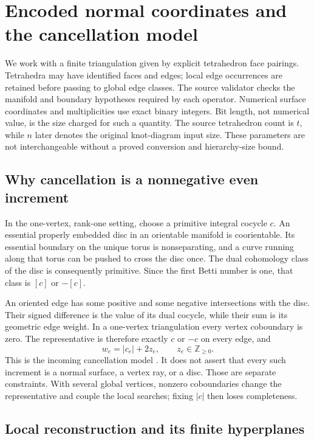 \section{Encoded normal coordinates and the cancellation model}
\label{sec:normal-background}

We work with a finite triangulation given by explicit tetrahedron face
pairings. Tetrahedra may have identified faces and edges; local edge
occurrences are retained before passing to global edge classes. The source
validator checks the manifold and boundary hypotheses required by each
operator. Numerical surface coordinates and multiplicities use exact binary
integers. Bit length, not numerical value, is the size charged for such a
quantity. The source tetrahedron count is $t$, while $n$ later denotes the
original knot-diagram input size. These parameters are not interchangeable
without a proved conversion and hierarchy-size bound.

\subsection{Why cancellation is a nonnegative even increment}

In the one-vertex, rank-one setting, choose a primitive integral cocycle $c$.
An essential properly embedded disc in an orientable manifold is coorientable.
Its essential boundary on the unique torus is nonseparating, and a curve
running along that torus can be pushed to cross the disc once. The dual
cohomology class of the disc is consequently primitive. Since the first Betti
number is one, that class is $[c]$ or $-[c]$.

An oriented edge has some positive and some negative intersections with the
disc. Their signed difference is the value of its dual cocycle, while their
sum is its geometric edge weight. In a one-vertex triangulation every vertex
coboundary is zero. The representative is therefore exactly $c$ or $-c$ on
every edge, and
\[
 w_e=|c_e|+2z_e,\qquad z_e\in\mathbb Z_{\geq0}.
\]
This is the incoming cancellation model \cite{incoming-cancellation}.
It does not assert that every such increment is a normal surface, a vertex
ray, or a disc. Those are separate constraints. With several global vertices,
nonzero coboundaries change the representative and couple the local searches;
fixing $|c|$ then loses completeness.

\subsection{Local reconstruction and its finite hyperplanes}

